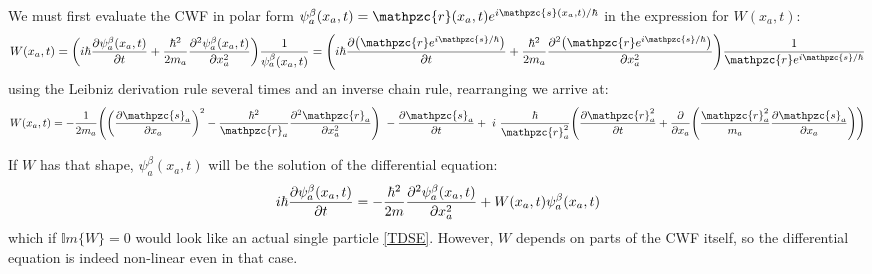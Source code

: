 \documentclass[11pt, a4paper]{article} %
\newcommand{\z}{\mathpzc{s}}
\newcommand{\p}{\mathpzc{r}}
\begin{document}
We must first evaluate the CWF in polar form $\psi^\beta_a(x_a,t)=\p(x_a,t) e^{i\z(x_a,t) / \hbar}$ in the expression for $W(x_a,t)$:
$$
W(x_a, t) = \qty(i \hbar \pdv{\psi_a^\beta(x_a,t)}{t} +\frac{\hbar^2}{2 m_a}\pdv[2]{\psi_a^\beta(x_a,t)}{x_a} ) \frac{1}{\psi_a^\beta(x_a,t)} = \qty(i \hbar \pdv{\qty(\p e^{i\z/\hbar})}{t} +\frac{\hbar^2}{2 m_a}\pdv[2]{\qty(\p e^{i\z/\hbar})}{x_a} ) \frac{1}{\p e^{i\z/\hbar}}
$$
using the Leibniz derivation rule several times and an inverse chain rule, rearranging we arrive at:
$$
W(x_a, t)=-\frac{1}{2m_a} \qty( \qty(\pdv{\z_a}{x_a})^2 -\frac{\hbar^2}{\p_a}\pdv[2]{\p_a}{x_a})\ -\pdv{\z_a}{t}+ \ i \ \frac{\hbar}{\p_a^2} \qty(\pdv{\p_a^2}{t}+\pdv{}{x_a}\qty(\frac{\p_a^2}{m_a}\pdv{\z_a}{x_a}))
$$

If $W$ has that shape, $\psi_a^\beta(x_a,t)$ will be the solution of the differential equation:\vspace{-0.2cm}
$$
i \hbar \pdv{\psi_a^\beta(x_a,t)}{t} = -\frac{\hbar^2}{2 m}\pdv[2]{\psi_a^\beta(x_a,t)}{x_a} + W(x_a,t) \psi_a^\beta(x_a,t)\vspace{-0.2cm}
$$
which if $\mathbb{I}m\{W\} =0$ would look like an actual single particle \ref{TDSE}. However, $W$ depends on parts of the CWF itself, so the differential equation is indeed non-linear even in that case.\\
\end{document}

